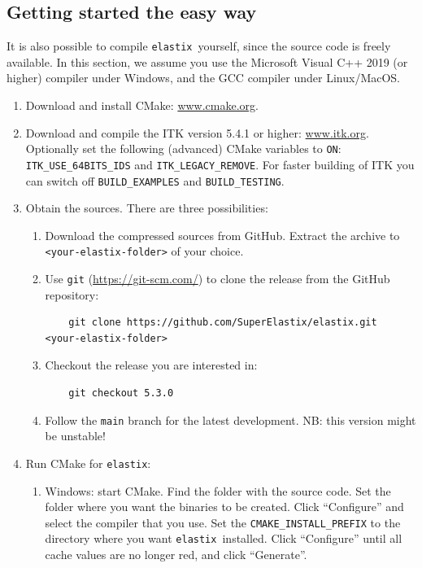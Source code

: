 \documentclass[]{report}
\newcommand{\elastix}{\texttt{elastix}}
\begin{document}
\subsection{Getting started the easy way}

It is also possible to compile \elastix\ yourself, since the source
code is freely available. In this section, we assume you use the
Microsoft Visual C++ 2019 (or higher) compiler under Windows, and
the GCC compiler under Linux/MacOS.

\begin{enumerate}
\item Download and install CMake: \url{www.cmake.org}.

\item Download and compile the ITK version 5.4.1 or higher: \url{www.itk.org}.
    Optionally set the following (advanced) CMake variables to
    \texttt{ON}: \texttt{ITK\_USE\_64BITS\_IDS}
    and \texttt{ITK\_LEGACY\_REMOVE}. For faster building of ITK
    you can switch off \texttt{BUILD\_EXAMPLES} and
    \texttt{BUILD\_TESTING}.

\item Obtain the sources. There are three possibilities:
  \begin{enumerate}
  \item Download the compressed sources from GitHub. Extract the
      archive to \texttt{<your-elastix-folder>} of your choice.
  \item Use \texttt{git} (\url{https://git-scm.com/})
      to clone the release from the GitHub repository:
    \begin{verbatim}
    git clone https://github.com/SuperElastix/elastix.git <your-elastix-folder>
    \end{verbatim}
  \item Checkout the release you are interested in:
    \begin{verbatim}
    git checkout 5.3.0
    \end{verbatim}
  \item Follow the \texttt{main} branch for the latest development.
    NB: this version might be unstable!
  \end{enumerate}

\item Run CMake for \elastix:
    \begin{enumerate}
    \item Windows: start CMake. Find the folder with the
        source code. Set the folder where you want the binaries to be
        created. Click ``Configure'' and select the compiler that you
        use. Set the \texttt{CMAKE\_INSTALL\_PREFIX} to the directory
        where you want \elastix\ installed. Click ``Configure'' until
        all cache values are no longer red, and click ``Generate''.


\end{enumerate}
\end{enumerate}
\end{document}
